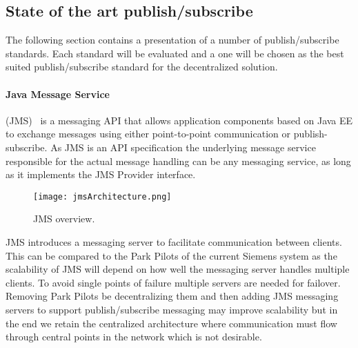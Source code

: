 



\subsection{State of the art publish/subscribe}
The following section contains a presentation of a number of publish/subscribe standards. Each standard will be evaluated and a one will be chosen as the best suited publish/subscribe standard for the decentralized solution.

\paragraph{Java Message Service} (JMS)~\cite{hapner2002java} is a messaging API that allows application components based on Java EE to exchange messages using either point-to-point communication or publish-subscribe. As JMS is an API specification the underlying message service responsible for the actual message handling can be any messaging service, as long as it implements the JMS Provider interface.

\begin{figure}[!h]
	\centering
	\texttt{[image: jmsArchitecture.png]} 
	\caption[JMS overview]{
		\label{fig:jmsOverview} 
		\footnotesize{%
			JMS overview.
		}
	}
\end{figure}

JMS introduces a messaging server to facilitate communication between clients. This can be compared to the Park Pilots of the current Siemens system as the scalability of JMS will depend on how well the messaging server handles multiple clients. To avoid single points of failure multiple servers are needed for failover. Removing Park Pilots be decentralizing them and then adding JMS messaging servers to support publish/subscribe messaging may improve scalability but in the end we retain the centralized architecture where communication must flow through central points in the network which is not desirable. 

